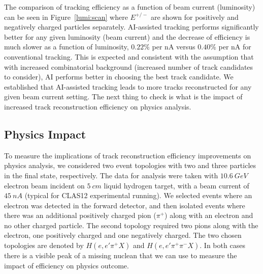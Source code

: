 The comparison of tracking efficiency as a function of beam current (luminosity) can be seen in Figure~\ref{lumi:scan} where $E^{+/-}$ are shown for positively and negatively charged particles separately. AI-assisted tracking performs significantly better for any given luminosity (beam current) and the decrease of efficiency is much slower as a function of luminosity, $0.22\%$ per nA versus $0.40\%$ per nA for conventional tracking. This is expected and consistent with the assumption that with increased combinatorial background (increased number of track candidates to consider), AI performs better in choosing the best track candidate. We established that AI-assisted
tracking leads to more tracks reconstructed for any given beam current setting. The next thing to check is what is the impact of increased track reconstruction efficiency on physics analysis.

\subsection{Physics Impact}

To measure the implications of track reconstruction efficiency improvements on physics analysis, we considered 
two event topologies with two and three particles in the final state, respectively. The data for analysis were 
taken with $10.6~GeV$ electron beam incident on $5~cm$ liquid hydrogen target, with a beam current of $45~nA$
(typical for CLAS12 experimental running). We selected events where an electron was detected in the forward detector, and 
then isolated events where there was an additional positively charged pion ($\pi^+$) along with an electron and no other 
charged particle. The second topology required two pions along with the electron, one positively charged and one 
negatively charged. The two chosen topologies are denoted by $H(e,e'\pi^+X)$ and $H(e,e'\pi^+\pi^-X)$. In both cases 
there is a visible peak of a missing nuclean that we can use to measure the impact of efficiency on physics outcome. 

